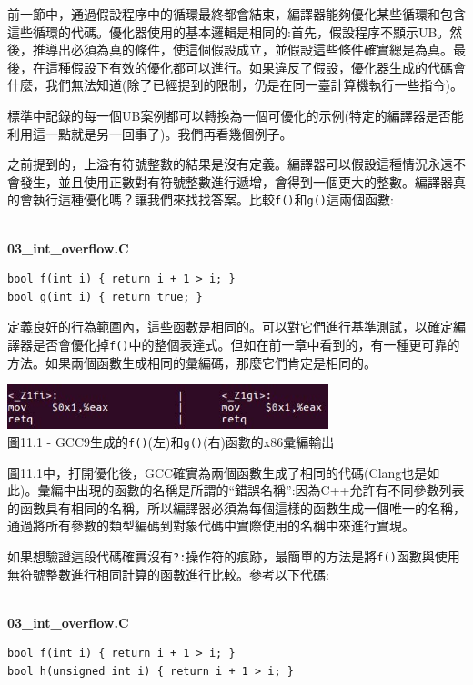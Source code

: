 前一節中，通過假設程序中的循環最終都會結束，編譯器能夠優化某些循環和包含這些循環的代碼。優化器使用的基本邏輯是相同的:首先，假設程序不顯示UB。然後，推導出必須為真的條件，使這個假設成立，並假設這些條件確實總是為真。最後，在這種假設下有效的優化都可以進行。如果違反了假設，優化器生成的代碼會什麼，我們無法知道(除了已經提到的限制，仍是在同一臺計算機執行一些指令)。

標準中記錄的每一個UB案例都可以轉換為一個可優化的示例(特定的編譯器是否能利用這一點就是另一回事了)。我們再看幾個例子。

之前提到的，上溢有符號整數的結果是沒有定義。編譯器可以假設這種情況永遠不會發生，並且使用正數對有符號整數進行遞增，會得到一個更大的整數。編譯器真的會執行這種優化嗎？讓我們來找找答案。比較\texttt{f()}和\texttt{g()}這兩個函數:

\hspace*{\fill} \\ %
\noindent
\textbf{03\_int\_overflow.C}
\begin{lstlisting}[style=styleCXX]
bool f(int i) { return i + 1 > i; }
bool g(int i) { return true; }
\end{lstlisting}

定義良好的行為範圍內，這些函數是相同的。可以對它們進行基準測試，以確定編譯器是否會優化掉\texttt{f()}中的整個表達式。但如在前一章中看到的，有一種更可靠的方法。如果兩個函數生成相同的彙編碼，那麼它們肯定是相同的。 

\begin{center}
\includegraphics[width=0.7\textwidth]{content/3/chapter11/images/1.jpg}\\
圖11.1 - GCC9生成的\texttt{f()}(左)和\texttt{g()}(右)函數的x86彙編輸出
\end{center}

圖11.1中，打開優化後，GCC確實為兩個函數生成了相同的代碼(Clang也是如此)。彙編中出現的函數的名稱是所謂的“錯誤名稱”:因為C++允許有不同參數列表的函數具有相同的名稱，所以編譯器必須為每個這樣的函數生成一個唯一的名稱，通過將所有參數的類型編碼到對象代碼中實際使用的名稱中來進行實現。

如果想驗證這段代碼確實沒有\texttt{?:}操作符的痕跡，最簡單的方法是將\texttt{f()}函數與使用無符號整數進行相同計算的函數進行比較。參考以下代碼:

\hspace*{\fill} \\ %
\noindent
\textbf{03\_int\_overflow.C}
\begin{lstlisting}[style=styleCXX]
bool f(int i) { return i + 1 > i; }
bool h(unsigned int i) { return i + 1 > i; }
\end{lstlisting}


